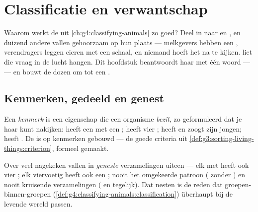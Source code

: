 \chapter{Classificatie en verwantschap}\label{ch:g6:classification-kinship}

Waarom werkt de  uit \cref{ch:g4:classifying-animals} zo
goed? Deel  in naar  en , en duizend andere 
vallen gehoorzaam op hun plaats --- melkgevers hebben een ,
verendragers leggen eieren met een schaal, en niemand hoeft het na te
kijken.  liet die vraag in de lucht
hangen. Dit hoofdstuk beantwoordt haar met één woord ---  ---
en bouwt de dozen om tot een .

\section{Kenmerken, gedeeld en genest}

\begin{definition}[Kenmerk]\label{def:g6:classification-kinship:attribute}
Een \emph{kenmerk} is een eigenschap die een organisme
\emph{bezit}, zo geformuleerd dat je haar kunt nakijken: heeft een 
met een ; heeft vier ; heeft  en zoogt zijn
jongen; heeft . De  is op kenmerken gebouwd --- de
goede criteria uit \cref{def:g3:sorting-living-things:criterion},
formeel gemaakt.
\end{definition}

\begin{proposition}\label{prop:g6:classification-kinship:nest}
Over veel  nagekeken vallen  in \emph{geneste}
verzamelingen uiteen --- elk  met  heeft ook vier ; elk
viervoetig  heeft ook een ; nooit het omgekeerde patroon
( zonder ) en nooit kruisende verzamelingen ( en
 tegelijk). Dat nesten is de reden dat groepen-binnen-groepen
(\cref{def:g4:classifying-animals:classification}) überhaupt bij de
levende wereld passen.
\end{proposition}
\admitted

